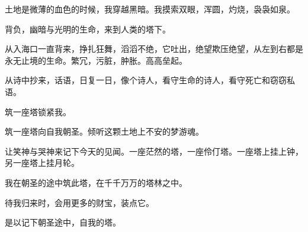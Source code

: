 \documentclass[UTF8]{article}
\begin{document}
\par 土地是微薄的血色的时候，我穿越黑暗。我摸索双眼，浑圆，灼烧，袅袅如泉。
\par 背负，幽暗与光明的生命，来到人类的塔下。
\par 从入海口一直背来，挣扎狂舞，滔滔不绝，它吐出，绝望欺压绝望，从左到右都是永无止境的生命。繁冗，污脏，肿胀。高高垒起。
\par 从诗中抄来，话语，日复一日，像个诗人，看守生命的诗人，看守死亡和窃窃私语。
\par 筑一座塔锁紧我。
\par 筑一座塔向自我朝圣。倾听这颗土地上不安的梦游魂。
\par 让笑神与哭神来记下今天的见闻。一座茫然的塔，一座伶仃塔。一座塔上挂上钟，另一座塔上挂月轮。
\par 我在朝圣的途中筑此塔，在千千万万的塔林之中。
\par 待我归来时，会用更多的财宝，装点它。
\par 是以记下朝圣途中，自我的塔。
\end{document}
